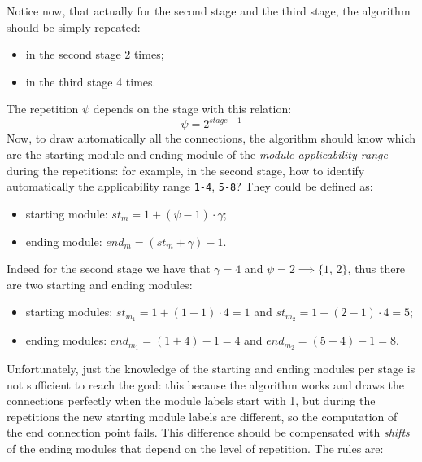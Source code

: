 \documentclass{ltxdoc} %
\begin{document}
Notice now, that actually for the second stage and the third stage, the algorithm should be simply repeated:
\begin{itemize}
\item in the second stage 2 times;
\item in the third stage 4 times.
\end{itemize}
The repetition $\psi$ depends on the stage with this relation:
\[\psi= 2^{stage-1}\]
Now, to draw automatically all the connections, the algorithm should know which are the starting module and ending module of the \emph{module applicability range} during the repetitions: for example, in the second stage, how to identify automatically the applicability range \texttt{1-4}, \texttt{5-8}? They could be defined as:
\begin{itemize}
\item starting module: $st_m=1+(\psi-1)\cdot\gamma $;
\item ending module: $end_m=(st_m+\gamma)-1$.
\end{itemize}
Indeed for the second stage we have that $\gamma=4$ and $\psi=2\implies \{1,\, 2\}$, thus there are two starting and ending modules:
\begin{itemize}
\item starting modules: $st_{m_1}=1+(1-1)\cdot 4=1$ and $st_{m_2}=1+(2-1)\cdot 4=5$;
\item ending modules:  $end_{m_1}=(1+4)-1=4$ and $end_{m_2}=(5+4)-1=8$.
\end{itemize}
Unfortunately, just the knowledge of the starting and ending modules per stage is not sufficient to reach the goal: this because the algorithm works and draws the connections perfectly when the module labels start with 1, but during the repetitions the new starting module labels are different, so the computation of the end connection point fails. This difference should be compensated with \emph{shifts} of the ending modules that depend on the level of repetition. The rules are:
\end{document}
